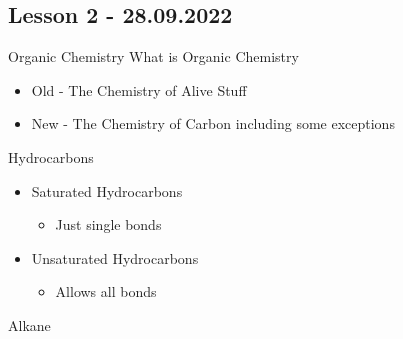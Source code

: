 \documentclass{article}
\begin{document}
\subsection{Lesson 2 - 28.09.2022}
Organic Chemistry\hfill\break
What is Organic Chemistry\hfill\break
\begin{itemize}
    \item Old - The Chemistry of Alive Stuff
    \item New - The Chemistry of Carbon including some exceptions
\end{itemize}
Hydrocarbons\hfill\break
\begin{itemize}
    \item Saturated Hydrocarbons
    \begin{itemize}
        \item Just single bonds
    \end{itemize}
    \item Unsaturated Hydrocarbons
    \begin{itemize}
        \item Allows all bonds
    \end{itemize}
\end{itemize}
Alkane
\end{document}
